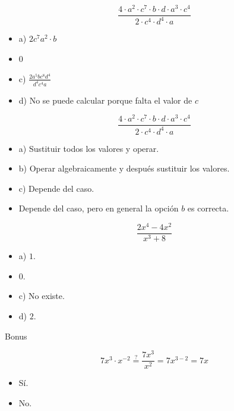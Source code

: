 \[
	\frac{4·a^2·c^7·b·d·a^3·c^4}{2·c^4·d^4·a}
\]

\begin{itemize}
	\item a) $2c^7a^2·b$
	\item {} $0$
	\item c) $\frac{2a^5bc^8d^4}{d^4c^4a}$
	\item d) No se puede calcular porque falta el valor de $c$
\end{itemize}

\[
	\frac{4·a^2·c^7·b·d·a^3·c^4}{2·c^4·d^4·a}
\]

\begin{itemize}
	\item a) Sustituir todos los valores y operar.
	\item b) Operar algebraicamente y después sustituir los valores.
	\item c) Depende del caso.
	\item {} Depende del caso, pero en general la opción $b$ es correcta.
\end{itemize}

\[
	\frac{2x^4-4x^2}{x^3+8}
\]

\begin{itemize}
	\item a) $1$.
	\item {} $0$.
	\item c) No existe.
	\item d) $2$.
\end{itemize}



\newbloq Bonus

\[
	7x^3·x^{-2} \overset{?}{=} \frac{7x^3}{x^2} = 7x^{3-2} = 7x
\]

\begin{itemize}
	\item {} Sí.
	\item No.
\end{itemize}




